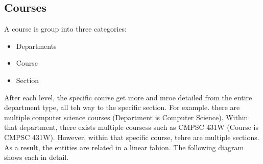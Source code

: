\documentclass{article}
\begin{document}
  \subsection{Courses}\label{sec:Concept:Courses}
    A course is group into three categories:
    \begin{itemize}
      \item Departments
      \item Course
      \item Section
    \end{itemize}
    After each level, the specific course get more and mroe detailed from the entire department type, all teh way to the specific section.  For example. there are multiple computer science courses (Department is Computer Science).  Within that department, there exists multiple coursess such as CMPSC 431W (Course is CMPSC 431W).  However, within that specific course, tehre are multiple sections.
    \newline\newline
    As a result, the entities are related in a linear fahion.  The following diagram shows each in detail.
\end{document}

